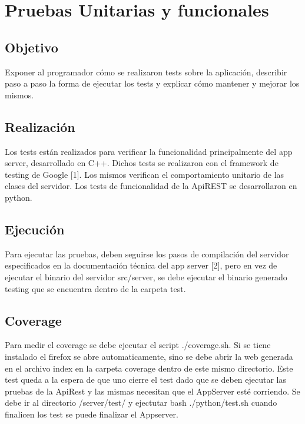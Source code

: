 \documentclass[a4paper,10pt,spanish]{sphinxmanual}
\begin{document}
\section{Pruebas Unitarias y funcionales}
\label{appServer:pruebas-unitarias-y-funcionales}

\subsection{Objetivo}
\label{testing:objetivo}\label{testing::doc}
Exponer al programador cómo se realizaron tests sobre la aplicación, describir paso a paso la forma de ejecutar los tests y explicar cómo mantener y mejorar los mismos.


\subsection{Realización}
\label{testing:realizacion}
Los tests están realizados para verificar la funcionalidad principalmente del app server, desarrollado en C++. Dichos tests se realizaron con el framework de testing de Google {[}1{]}.
Los mismos verifican el comportamiento unitario de las clases del servidor.
Los tests de funcionalidad de la ApiREST se desarrollaron en python.


\subsection{Ejecución}
\label{testing:ejecucion}
Para ejecutar las pruebas, deben seguirse los pasos de compilación del servidor especificados en la documentación técnica del app server {[}2{]}, pero en vez de ejecutar el binario del servidor src/server, se debe ejecutar el binario generado testing que se encuentra dentro de la carpeta test.


\subsection{Coverage}
\label{testing:coverage}
Para medir el coverage se debe ejecutar el script ./coverage.sh. Si se tiene instalado el firefox se abre automaticamente, sino se debe abrir la web generada en el archivo index en la carpeta coverage dentro de este mismo directorio.
Este test queda a la espera de que uno cierre el test dado que se deben ejecutar las pruebas de la ApiRest y las mismas necesitan que el AppServer esté corriendo.
Se debe ir al directorio /server/test/ y ejectutar bash ./python/test.sh cuando finalicen los test se puede finalizar el Appserver.
\end{document}
